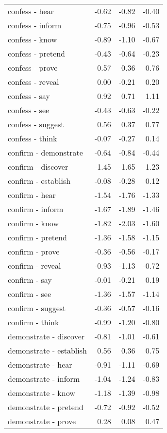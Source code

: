\begin{longtable}{lrrr}
  confess - hear & -0.62 & -0.82 & -0.40 \\ 
  confess - inform & -0.75 & -0.96 & -0.53 \\ 
  confess - know & -0.89 & -1.10 & -0.67 \\ 
  confess - pretend & -0.43 & -0.64 & -0.23 \\ 
  confess - prove & 0.57 & 0.36 & 0.76 \\ 
  confess - reveal & 0.00 & -0.21 & 0.20 \\ 
  confess - say & 0.92 & 0.71 & 1.11 \\ 
  confess - see & -0.43 & -0.63 & -0.22 \\ 
  confess - suggest & 0.56 & 0.37 & 0.77 \\ 
  confess - think & -0.07 & -0.27 & 0.14 \\ 
  confirm - demonstrate & -0.64 & -0.84 & -0.44 \\ 
  confirm - discover & -1.45 & -1.65 & -1.23 \\ 
  confirm - establish & -0.08 & -0.28 & 0.12 \\ 
  confirm - hear & -1.54 & -1.76 & -1.33 \\ 
  confirm - inform & -1.67 & -1.89 & -1.46 \\ 
  confirm - know & -1.82 & -2.03 & -1.60 \\ 
  confirm - pretend & -1.36 & -1.58 & -1.15 \\ 
  confirm - prove & -0.36 & -0.56 & -0.17 \\ 
  confirm - reveal & -0.93 & -1.13 & -0.72 \\ 
  confirm - say & -0.01 & -0.21 & 0.19 \\ 
  confirm - see & -1.36 & -1.57 & -1.14 \\ 
  confirm - suggest & -0.36 & -0.57 & -0.16 \\ 
  confirm - think & -0.99 & -1.20 & -0.80 \\ 
  demonstrate - discover & -0.81 & -1.01 & -0.61 \\ 
  demonstrate - establish & 0.56 & 0.36 & 0.75 \\ 
  demonstrate - hear & -0.91 & -1.11 & -0.69 \\ 
  demonstrate - inform & -1.04 & -1.24 & -0.83 \\ 
  demonstrate - know & -1.18 & -1.39 & -0.98 \\ 
  demonstrate - pretend & -0.72 & -0.92 & -0.52 \\ 
  demonstrate - prove & 0.28 & 0.08 & 0.47 \\ 

\end{longtable}
